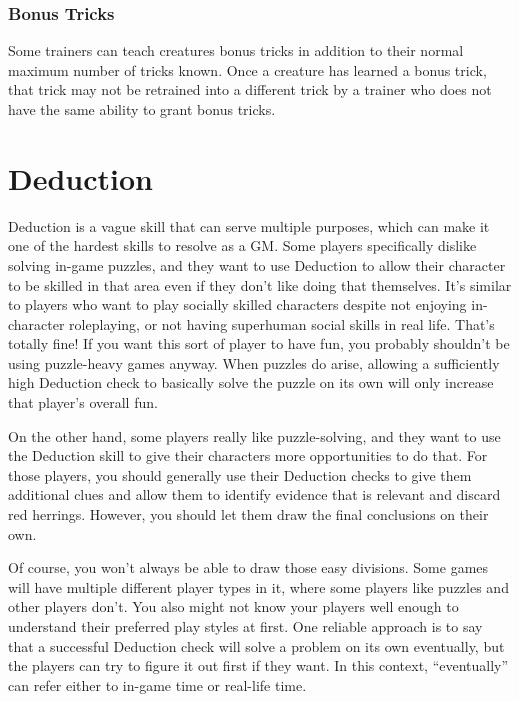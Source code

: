     \subsubsection{Bonus Tricks}\label{Bonus Tricks}
      Some trainers can teach creatures bonus tricks in addition to their normal maximum number of tricks known.
      Once a creature has learned a bonus trick, that trick may not be retrained into a different trick by a trainer who does not have the same ability to grant bonus tricks.

\section{Deduction}

  Deduction is a vague skill that can serve multiple purposes, which can make it one of the hardest skills to resolve as a GM.
  Some players specifically dislike solving in-game puzzles, and they want to use Deduction to allow their character to be skilled in that area even if they don't like doing that themselves.
  It's similar to players who want to play socially skilled characters despite not enjoying in-character roleplaying, or not having superhuman social skills in real life.
  That's totally fine!
  If you want this sort of player to have fun, you probably shouldn't be using puzzle-heavy games anyway.
  When puzzles do arise, allowing a sufficiently high Deduction check to basically solve the puzzle on its own will only increase that player's overall fun.

  On the other hand, some players really like puzzle-solving, and they want to use the Deduction skill to give their characters more opportunities to do that.
  For those players, you should generally use their Deduction checks to give them additional clues and allow them to identify evidence that is relevant and discard red herrings.
  However, you should let them draw the final conclusions on their own.

  Of course, you won't always be able to draw those easy divisions.
  Some games will have multiple different player types in it, where some players like puzzles and other players don't.
  You also might not know your players well enough to understand their preferred play styles at first.
  One reliable approach is to say that a successful Deduction check will solve a problem on its own eventually, but the players can try to figure it out first if they want.
  In this context, ``eventually'' can refer either to in-game time or real-life time.

